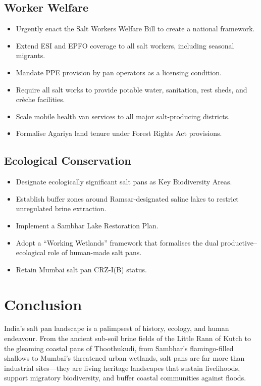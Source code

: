 \documentclass[12pt,a4paper]{article}
\begin{document}
\subsection{Worker Welfare}

\begin{itemize}[leftmargin=*]
  \item Urgently enact the Salt Workers Welfare Bill to create a national framework.
  \item Extend ESI and EPFO coverage to all salt workers, including seasonal migrants.
  \item Mandate PPE provision by pan operators as a licensing condition.
  \item Require all salt works to provide potable water, sanitation, rest sheds,
        and crèche facilities.
  \item Scale mobile health van services to all major salt-producing districts.
  \item Formalise Agariya land tenure under Forest Rights Act provisions.
\end{itemize}

\subsection{Ecological Conservation}

\begin{itemize}[leftmargin=*]
  \item Designate ecologically significant salt pans as Key Biodiversity Areas.
  \item Establish buffer zones around Ramsar-designated saline lakes to restrict
        unregulated brine extraction.
  \item Implement a Sambhar Lake Restoration Plan.
  \item Adopt a ``Working Wetlands'' framework that formalises the dual
        productive--ecological role of human-made salt pans.
  \item Retain Mumbai salt pan CRZ-I(B) status.
\end{itemize}

\section{Conclusion}

India's salt pan landscape is a palimpsest of history, ecology, and human endeavour.
From the ancient sub-soil brine fields of the Little Rann of Kutch to the gleaming
coastal pans of Thoothukudi, from Sambhar's flamingo-filled shallows to Mumbai's
threatened urban wetlands, salt pans are far more than industrial sites—they are living
heritage landscapes that sustain livelihoods, support migratory biodiversity, and buffer
coastal communities against floods.
\end{document}
